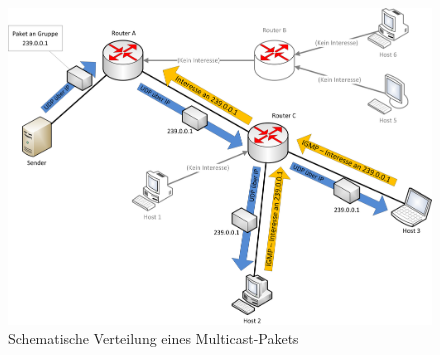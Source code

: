 \begin{figure}[H]
\includegraphics[width=15cm]{images/multicasting.png}
\centering
\caption{Schematische Verteilung eines Multicast-Pakets}
\label{mc_overview}
\end{figure}

